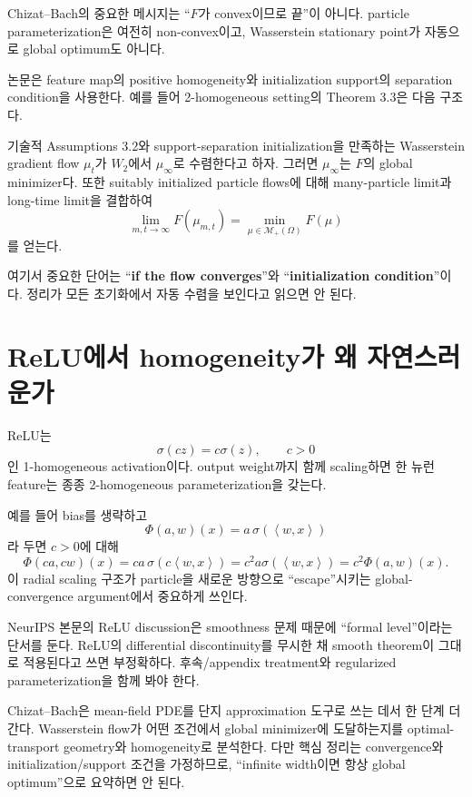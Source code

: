 \documentclass[11pt,a4paper,oneside,openany]{memoir}
\newcommand{\inner}[2]{\left\langle #1,#2\right\rangle}
\theoremstyle{definition}
\begin{document}
Chizat--Bach의 중요한 메시지는 ``$F$가 convex이므로 끝''이 아니다.
particle parameterization은 여전히 non-convex이고, Wasserstein stationary point가 자동으로 global optimum도 아니다.

논문은 feature map의 positive homogeneity와 initialization support의 separation condition을 사용한다.
예를 들어 2-homogeneous setting의 Theorem 3.3은 다음 구조다.

\begin{paperbox}[--- Theorem 3.3의 핵심 형태]
기술적 Assumptions 3.2와 support-separation initialization을 만족하는 Wasserstein gradient flow
$\mu_t$가 $W_2$에서 $\mu_\infty$로 수렴한다고 하자. 그러면 $\mu_\infty$는 $F$의 global minimizer다.
또한 suitably initialized particle flows에 대해 many-particle limit과 long-time limit을 결합하여
\[
  \lim_{m,t\to\infty}F(\mu_{m,t})
  =\min_{\mu\in\mathcal M_+(\Omega)}F(\mu)
\]
를 얻는다.
\end{paperbox}

여기서 중요한 단어는 ``\textbf{if the flow converges}''와 ``\textbf{initialization condition}''이다.
정리가 모든 초기화에서 자동 수렴을 보인다고 읽으면 안 된다.

\section{ReLU에서 homogeneity가 왜 자연스러운가}

ReLU는
\[
  \sigma(cz)=c\sigma(z),\qquad c>0
\]
인 1-homogeneous activation이다. output weight까지 함께 scaling하면 한 뉴런 feature는 종종
2-homogeneous parameterization을 갖는다.

예를 들어 bias를 생략하고
\[
  \Phi(a,w)(x)=a\,\sigma(\inner{w}{x})
\]
라 두면 $c>0$에 대해
\[
  \Phi(ca,cw)(x)
  =ca\,\sigma(c\inner{w}{x})
  =c^2a\sigma(\inner{w}{x})
  =c^2\Phi(a,w)(x).
\]
이 radial scaling 구조가 particle을 새로운 방향으로 ``escape''시키는 global-convergence argument에서
중요하게 쓰인다.

\begin{warningbox}
NeurIPS 본문의 ReLU discussion은 smoothness 문제 때문에 ``formal level''이라는 단서를 둔다.
ReLU의 differential discontinuity를 무시한 채 smooth theorem이 그대로 적용된다고 쓰면 부정확하다.
후속/appendix treatment와 regularized parameterization을 함께 봐야 한다.
\end{warningbox}

\begin{presentbox}
Chizat--Bach은 mean-field PDE를 단지 approximation 도구로 쓰는 데서 한 단계 더 간다.
Wasserstein flow가 어떤 조건에서 global minimizer에 도달하는지를 optimal-transport geometry와
homogeneity로 분석한다. 다만 핵심 정리는 convergence와 initialization/support 조건을 가정하므로,
``infinite width이면 항상 global optimum''으로 요약하면 안 된다.
\end{presentbox}
\end{document}
